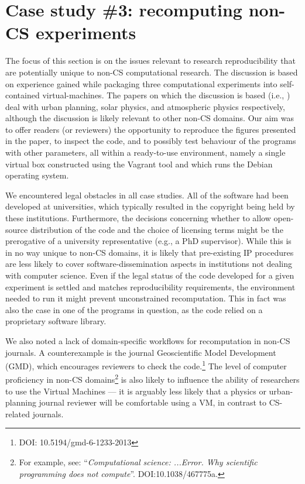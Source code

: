 \section{Case study \#3: recomputing non-CS experiments}
\label{s:group3}

The focus of this section is on the issues relevant to research reproducibility that are potentially unique to non-CS computational research.
The discussion is based on experience gained while packaging three computational experiments into self-contained virtual-machines.
The papers on which the discussion is based (i.e., \cite{danielpaper,bareford2010nanoflare,arabas2013libcloud}) deal with urban planning, solar physics, and atmospheric physics respectively, although the discussion is likely relevant to other non-CS domains.
Our aim was to offer readers (or reviewers) the opportunity to reproduce the figures presented in the paper, to inspect the code, and to possibly test behaviour of the programs with other parameters, all within a ready-to-use environment, namely a single virtual box constructed using the Vagrant tool and which runs the Debian operating system.

%
We encountered legal obstacles in all case studies.
All of the software had been developed at universities, which typically resulted in the copyright being held by these institutions.
Furthermore, the decisions concerning whether to allow open-source distribution of the code and the choice of licensing terms might be the prerogative of a university representative (e.g., a PhD supervisor).
While this is in no way unique to non-CS domains, it is likely that pre-existing IP procedures are less likely to cover software-dissemination aspects in institutions not dealing with computer science.
Even if the legal status of the code developed for a given experiment is settled and matches reproducibility requirements, the environment needed to run it might prevent unconstrained recomputation.
This in fact was also the case in one of the programs in question, as the code relied on a proprietary software library.

We also noted a lack of domain-specific workflows for recomputation in non-CS journals.
A counterexample is the journal Geoscientific Model Development (GMD), which encourages reviewers to check the code.\footnote{DOI: 10.5194/gmd-6-1233-2013 }
The level of computer proficiency in non-CS domains\footnote{For example, see: ``\emph{Computational science: ...Error. Why scientific programming does not compute}''. DOI:10.1038/467775a.} is also likely to influence the ability of researchers to use the Virtual Machines --- it is arguably less likely that a physics or urban-planning journal reviewer will be comfortable using a VM, in contrast to CS-related journals.

